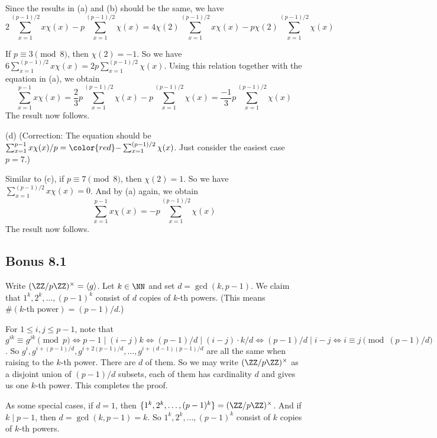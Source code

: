 \documentclass[../Chapter.tex]{subfiles}
\begin{document}
Since the results in (a) and (b) should be the same, we have $$2\sum_{x=1}^{(p-1)/2} x\chi(x) - p\sum_{x=1}^{(p-1)/2} \chi(x) = 4\chi(2)\sum_{x=1}^{(p-1)/2} x\chi(x) - p\chi(2)\sum_{x=1}^{(p-1)/2} \chi(x)$$

If $p\equiv3\pmod{8}$, then $\chi(2)=-1$. So we have $6\sum_{x=1}^{(p-1)/2} x\chi(x) = 2p\sum_{x=1}^{(p-1)/2} \chi(x)$. Using this relation together with the equation in (a), we obtain $$\sum_{x=1}^{p-1} x\chi(x) = \frac{2}{3}p\sum_{x=1}^{(p-1)/2} \chi(x) - p\sum_{x=1}^{(p-1)/2} \chi(x) = \frac{-1}{3}p\sum_{x=1}^{(p-1)/2} \chi(x)$$ The result now follows.

(d) (Correction: The equation should be $\sum_{x=1}^{p-1}x\chi(x)/p={\color{red}-}\sum_{x=1}^{(p-1)/2} \chi(x)$. Just consider the easiest case $p=7$.)

Similar to (c), if $p\equiv7\pmod{8}$, then $\chi(2)=1$. So we have $\sum_{x=1}^{(p-1)/2} x\chi(x)=0$. And by (a) again, we obtain $$\sum_{x=1}^{p-1} x\chi(x) = -p\sum_{x=1}^{(p-1)/2} \chi(x)$$ The result now follows.

\subsection*{Bonus 8.1} \label{Bonus 8.1}

Write $(\ZZ/p\ZZ)^\times=\langle g\rangle$. Let $k\in\NN$ and set $d=\gcd(k,p-1)$. We claim that $1^k,2^k,\ldots,(p-1)^k$ consist of $d$ copies of $k$-th powers. (This means $\#(k\text{-th power})=(p-1)/d$.)

For $1\leq i,j\leq p-1$, note that $g^{ik}\equiv g^{jk} \pmod{p} \iff p-1\mid (i-j)k \iff (p-1)/d\mid (i-j)\cdot k/d \iff (p-1)/d\mid i-j \iff i\equiv j \pmod{(p-1)/d}$. So $g^i,g^{i+(p-1)/d},g^{i+2(p-1)/d},\ldots,g^{i+(d-1)(p-1)/d}$ are all the same when raising to the $k$-th power. There are $d$ of them. So we may write $(\ZZ/p\ZZ)^\times$ as a disjoint union of $(p-1)/d$ subsets, each of them has cardinality $d$ and gives us one $k$-th power. This completes the proof.

As some special cases, if $d=1$, then $\{1^k,2^k,\ldots,(p-1)^k\}=(\ZZ/p\ZZ)^\times$. And if $k\mid p-1$, then $d=\gcd(k,p-1)=k$. So $1^k,2^k,\ldots,(p-1)^k$ consist of $k$ copies of $k$-th powers.
\end{document}
